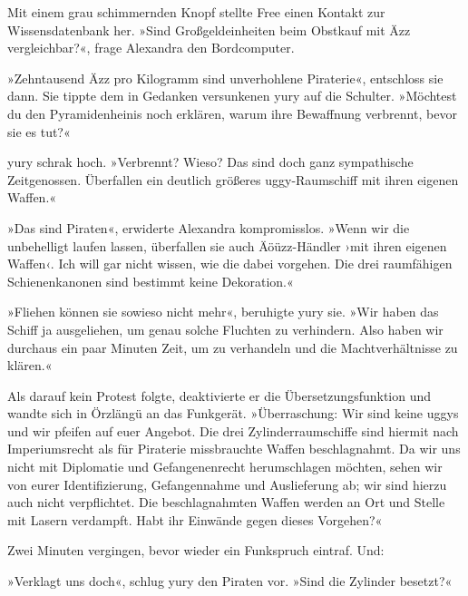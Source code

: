Mit einem grau schimmernden Knopf stellte Free einen Kontakt zur Wissensdatenbank her. »Sind Großgeldeinheiten beim Obstkauf mit Äzz vergleichbar?«, frage Alexandra den Bordcomputer.


»Zehntausend Äzz pro Kilogramm sind unverhohlene Piraterie«, entschloss sie dann. Sie tippte dem in Gedanken versunkenen yury auf die Schulter. »Möchtest du den Pyramidenheinis noch erklären, warum ihre Bewaffnung verbrennt, bevor sie es tut?«

yury schrak hoch. »Verbrennt? Wieso? Das sind doch ganz sympathische Zeitgenossen. Überfallen ein deutlich größeres uggy-Raumschiff mit ihren eigenen Waffen.«

»Das sind Piraten«, erwiderte Alexandra kompromisslos. »Wenn wir die unbehelligt laufen lassen, überfallen sie auch Äöüzz-Händler ›mit ihren eigenen Waffen‹. Ich will gar nicht wissen, wie die dabei vorgehen. Die drei raumfähigen Schienenkanonen sind bestimmt keine Dekoration.«

»Fliehen können sie sowieso nicht mehr«, beruhigte yury sie. »Wir haben das Schiff ja ausgeliehen, um genau solche Fluchten zu verhindern. Also haben wir durchaus ein paar Minuten Zeit, um zu verhandeln und die Machtverhältnisse zu klären.«

Als darauf kein Protest folgte, deaktivierte er die Übersetzungsfunktion und wandte sich in Örzlängü an das Funkgerät. »Überraschung: Wir sind keine uggys und wir pfeifen auf euer Angebot. Die drei Zylinderraumschiffe sind hiermit nach Imperiumsrecht als für Piraterie missbrauchte Waffen beschlagnahmt. Da wir uns nicht mit Diplomatie und Gefangenenrecht herumschlagen möchten, sehen wir von eurer Identifizierung, Gefangennahme und Auslieferung ab; wir sind hierzu auch nicht verpflichtet. Die beschlagnahmten Waffen werden an Ort und Stelle mit Lasern verdampft. Habt ihr Einwände gegen dieses Vorgehen?«

Zwei Minuten vergingen, bevor wieder ein Funkspruch eintraf.  Und: 

»Verklagt uns doch«, schlug yury den Piraten vor. »Sind die Zylinder besetzt?«


